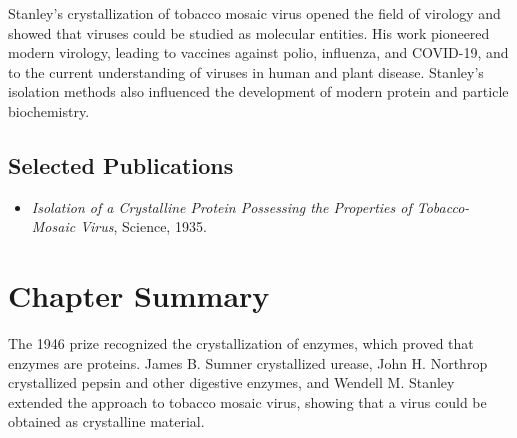 Stanley's crystallization of tobacco mosaic virus opened the field of virology and showed that viruses could be studied as molecular entities. His work pioneered modern virology, leading to vaccines against polio, influenza, and COVID-19, and to the current understanding of viruses in human and plant disease. Stanley's isolation methods also influenced the development of modern protein and particle biochemistry.

\subsection*{Selected Publications}

\begin{itemize}

\item \emph{Isolation of a Crystalline Protein Possessing the Properties of Tobacco-Mosaic Virus}, Science, 1935.

\end{itemize}

\clearpage

\section*{Chapter Summary}

The 1946 prize recognized the crystallization of enzymes, which proved that enzymes are proteins. James B. Sumner crystallized urease, John H. Northrop crystallized pepsin and other digestive enzymes, and Wendell M. Stanley extended the approach to tobacco mosaic virus, showing that a virus could be obtained as crystalline material.
